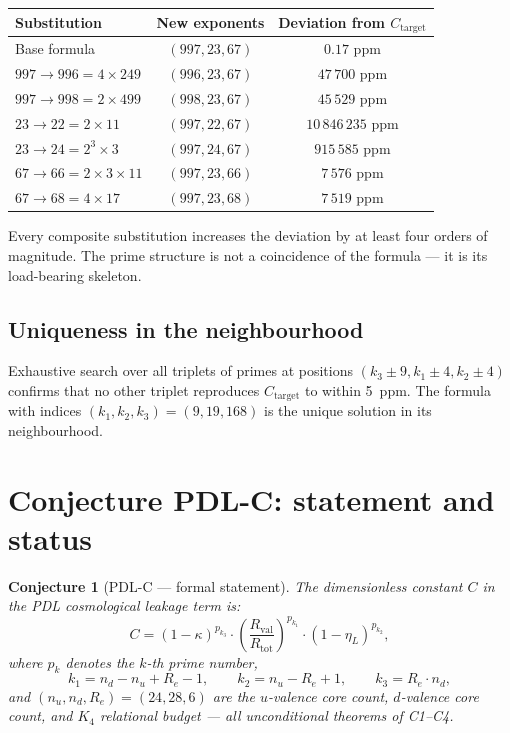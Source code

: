 \documentclass[12pt,a4paper]{article}
\newtheorem{conjecture}[theorem]{Conjecture}
\newcommand{\Kfour}{K_4}
\newcommand{\Rtot}{R_{\mathrm{tot}}}
\newcommand{\Rval}{R_{\mathrm{val}}}
\renewcommand{\Re}{R_e}
\newcommand{\kap}{\kappa}
\newcommand{\etaL}{\eta_L}
\begin{document}
\begin{center}
\renewcommand{\arraystretch}{1.3}
\begin{tabular}{lcc}
\toprule
Substitution & New exponents & Deviation from $C_{\text{target}}$ \\
\midrule
Base formula & $(997, 23, 67)$ & $0.17$ ppm \\
$997 \to 996 = 4 \times 249$ & $(996, 23, 67)$ & $47\,700$ ppm \\
$997 \to 998 = 2 \times 499$ & $(998, 23, 67)$ & $45\,529$ ppm \\
$23 \to 22 = 2 \times 11$ & $(997, 22, 67)$ & $10\,846\,235$ ppm \\
$23 \to 24 = 2^3 \times 3$ & $(997, 24, 67)$ & $915\,585$ ppm \\
$67 \to 66 = 2 \times 3 \times 11$ & $(997, 23, 66)$ & $7\,576$ ppm \\
$67 \to 68 = 4 \times 17$ & $(997, 23, 68)$ & $7\,519$ ppm \\
\bottomrule
\end{tabular}
\end{center}

Every composite substitution increases the deviation by at least four orders of magnitude. The prime structure is not a coincidence of the formula — it is its load-bearing skeleton.

\subsection{Uniqueness in the neighbourhood}

Exhaustive search over all triplets of primes at positions $(k_3 \pm 9, k_1 \pm 4, k_2 \pm 4)$ confirms that no other triplet reproduces $C_{\text{target}}$ to within 5~ppm. The formula with indices $(k_1, k_2, k_3) = (9, 19, 168)$ is the unique solution in its neighbourhood.

\section{Conjecture PDL-C: statement and status}
\label{sec:conjecture}

\begin{conjecture}[PDL-C — formal statement]
\label{conj:PDL-C-formal}
The dimensionless constant $C$ in the PDL cosmological leakage term is:
\begin{equation}
C = (1-\kap)^{p_{k_3}} \cdot \left(\frac{\Rval}{\Rtot}\right)^{p_{k_1}} \cdot (1-\etaL)^{p_{k_2}},
\label{eq:PDL-C-formal}
\end{equation}
where $p_k$ denotes the $k$-th prime number,
\[
k_1 = n_d - n_u + \Re - 1,\qquad k_2 = n_u - \Re + 1,\qquad k_3 = \Re \cdot n_d,
\]
and $(n_u, n_d, \Re) = (24, 28, 6)$ are the $u$-valence core count, $d$-valence core count, and $\Kfour$ relational budget — all unconditional theorems of C1--C4.
\end{conjecture}
\end{document}

